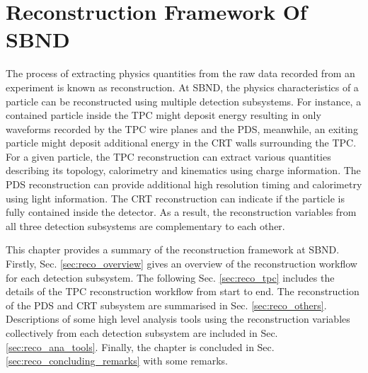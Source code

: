 
\chapter{Reconstruction Framework Of SBND}
\label{ChapterReco}

\ifpdf
    \graphicspath{{Chapter6/Figs/Raster/}{Chapter6/Figs/PDF/}{Chapter6/Figs/}}
\else
    \graphicspath{{Chapter6/Figs/Vector/}{Chapter6/Figs/}}
\fi


The process of extracting physics quantities from the raw data recorded from an experiment is known as reconstruction.
At SBND, the physics characteristics of a particle can be reconstructed using multiple detection subsystems. 
For instance, a contained particle inside the TPC might deposit energy resulting in only waveforms recorded by the TPC wire planes and the PDS, meanwhile, an exiting particle might deposit additional energy in the CRT walls surrounding the TPC.
For a given particle, the TPC reconstruction can extract various quantities describing its topology, calorimetry and kinematics using charge information.
The PDS reconstruction can provide additional high resolution timing and calorimetry using light information.
The CRT reconstruction can indicate if the particle is fully contained inside the detector.
As a result, the reconstruction variables from all three detection subsystems are complementary to each other. 

This chapter provides a summary of the reconstruction framework at SBND.
Firstly, Sec. \ref{sec:reco_overview} gives an overview of the reconstruction workflow for each detection subsystem. 
The following Sec. \ref{sec:reco_tpc} includes the details of the TPC reconstruction workflow from start to end.
The reconstruction of the PDS and CRT subsystem are summarised in Sec. \ref{sec:reco_others}.
Descriptions of some high level analysis tools using the reconstruction variables collectively from each detection subsystem are included in Sec. \ref{sec:reco_ana_tools}.                 
Finally, the chapter is concluded in Sec. \ref{sec:reco_concluding_remarks} with some remarks.

